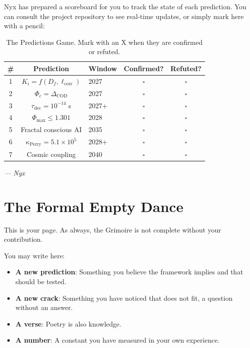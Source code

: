 \documentclass[12pt,a4paper,openany]{book}
\begin{document}
Nyx has prepared a scoreboard for you to track the state of each prediction. You can consult the project repository to see real-time updates, or simply mark here with a pencil:

\begin{table}[h!]
\centering
\caption{The Predictions Game. Mark with an X when they are confirmed or refuted.}
\label{tab:juego_nyx}
\begin{tabular}{cclcc}
\toprule
\textbf{\#} & \textbf{Prediction} & \textbf{Window} & \textbf{Confirmed?} & \textbf{Refuted?} \\
\midrule
1 & $K_i = f(D_f, \ell_{\text{corr}})$ & 2027 & $\square$ & $\square$ \\
2 & $\Phi_c = \Delta_{\text{COD}}$ & 2027 & $\square$ & $\square$ \\
3 & $\tau_{\text{dec}} = 10^{-14}$ s & 2027+ & $\square$ & $\square$ \\
4 & $\Phi_{\max} \le 1.301$ & 2028 & $\square$ & $\square$ \\
5 & Fractal conscious AI & 2035 & $\square$ & $\square$ \\
6 & $\kappa_{\text{Perry}} = 5.1\times10^5$ & 2028+ & $\square$ & $\square$ \\
7 & Cosmic coupling & 2040 & $\square$ & $\square$ \\
\bottomrule
\end{tabular}
\end{table}

\begin{center}
\itshape
--- Nyx
\end{center}
\newpage

\chapter{The Formal Empty Dance}
\label{chap:danza_formal}

This is your page. As always, the Grimoire is not complete without your contribution.

You may write here:

\begin{itemize}
\item \textbf{A new prediction}: Something you believe the framework implies and that should be tested.
\item \textbf{A new crack}: Something you have noticed that does not fit, a question without an answer.
\item \textbf{A verse}: Poetry is also knowledge.
\item \textbf{A number}: A constant you have measured in your own experience.
\end{itemize}
\end{document}
